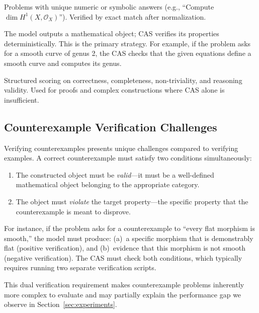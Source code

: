 \begin{description}[nosep]
  \item[Strategy A (Exact, 14 problems, 4.2\%):] Problems with unique numeric or symbolic answers (e.g., ``Compute $\dim H^1(X, \mathcal{O}_X)$'').
  Verified by exact match after normalization.
  \item[Strategy B (CAS, 309 problems, 93.1\%):] The model outputs a mathematical object; CAS verifies its properties deterministically.
  This is the primary strategy.
  For example, if the problem asks for a smooth curve of genus 2, the CAS checks that the given equations define a smooth curve and computes its genus.
  \item[Strategy C (Rubric, 9 problems, 2.7\%):] Structured scoring on correctness, completeness, non-triviality, and reasoning validity.
  Used for proofs and complex constructions where CAS alone is insufficient.
\end{description}

\subsection{Counterexample Verification Challenges}
\label{sec:counterexample-verification}

Verifying counterexamples presents unique challenges compared to verifying examples.
A correct counterexample must satisfy two conditions simultaneously:
\begin{enumerate}[nosep]
  \item The constructed object must be \emph{valid}---it must be a well-defined mathematical object belonging to the appropriate category.
  \item The object must \emph{violate} the target property---the specific property that the counterexample is meant to disprove.
\end{enumerate}

For instance, if the problem asks for a counterexample to ``every flat morphism is smooth,'' the model must produce:
(a)~a specific morphism that is demonstrably flat (positive verification), and
(b)~evidence that this morphism is not smooth (negative verification).
The CAS must check both conditions, which typically requires running two separate verification scripts.

This dual verification requirement makes counterexample problems inherently more complex to evaluate and may partially explain the performance gap we observe in Section~\ref{sec:experiments}.

